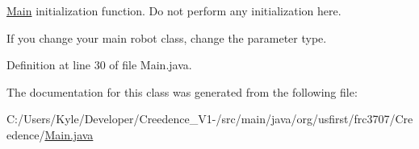 \mbox{\hyperlink{classorg_1_1usfirst_1_1frc3707_1_1_creedence_1_1_main}{Main}} initialization function. Do not perform any initialization here.

If you change your main robot class, change the parameter type. 

Definition at line 30 of file Main.\+java.



The documentation for this class was generated from the following file\+:\begin{DoxyCompactItemize}
\item 
C\+:/\+Users/\+Kyle/\+Developer/\+Creedence\+\_\+\+V1-\//src/main/java/org/usfirst/frc3707/\+Creedence/\mbox{\hyperlink{_main_8java}{Main.\+java}}\end{DoxyCompactItemize}
